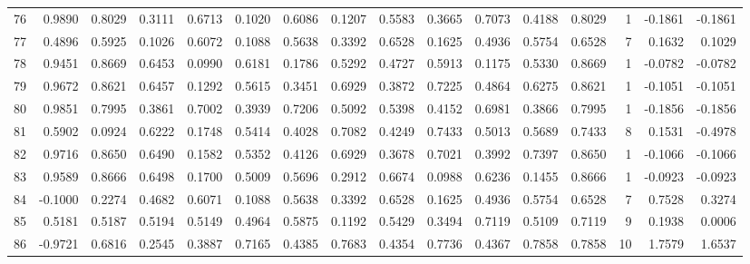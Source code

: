 \begin{tabular}{lrrrrrrrrrrrrrrr}
76  &      0.9890 &  0.8029 &  0.3111 &  0.6713 &  0.1020 &  0.6086 &  0.1207 &  0.5583 &  0.3665 &  0.7073 &   0.4188 &     0.8029 &      1 &                   -0.1861 &                    -0.1861 \\
77  &      0.4896 &  0.5925 &  0.1026 &  0.6072 &  0.1088 &  0.5638 &  0.3392 &  0.6528 &  0.1625 &  0.4936 &   0.5754 &     0.6528 &      7 &                    0.1632 &                     0.1029 \\
78  &      0.9451 &  0.8669 &  0.6453 &  0.0990 &  0.6181 &  0.1786 &  0.5292 &  0.4727 &  0.5913 &  0.1175 &   0.5330 &     0.8669 &      1 &                   -0.0782 &                    -0.0782 \\
79  &      0.9672 &  0.8621 &  0.6457 &  0.1292 &  0.5615 &  0.3451 &  0.6929 &  0.3872 &  0.7225 &  0.4864 &   0.6275 &     0.8621 &      1 &                   -0.1051 &                    -0.1051 \\
80  &      0.9851 &  0.7995 &  0.3861 &  0.7002 &  0.3939 &  0.7206 &  0.5092 &  0.5398 &  0.4152 &  0.6981 &   0.3866 &     0.7995 &      1 &                   -0.1856 &                    -0.1856 \\
81  &      0.5902 &  0.0924 &  0.6222 &  0.1748 &  0.5414 &  0.4028 &  0.7082 &  0.4249 &  0.7433 &  0.5013 &   0.5689 &     0.7433 &      8 &                    0.1531 &                    -0.4978 \\
82  &      0.9716 &  0.8650 &  0.6490 &  0.1582 &  0.5352 &  0.4126 &  0.6929 &  0.3678 &  0.7021 &  0.3992 &   0.7397 &     0.8650 &      1 &                   -0.1066 &                    -0.1066 \\
83  &      0.9589 &  0.8666 &  0.6498 &  0.1700 &  0.5009 &  0.5696 &  0.2912 &  0.6674 &  0.0988 &  0.6236 &   0.1455 &     0.8666 &      1 &                   -0.0923 &                    -0.0923 \\
84  &     -0.1000 &  0.2274 &  0.4682 &  0.6071 &  0.1088 &  0.5638 &  0.3392 &  0.6528 &  0.1625 &  0.4936 &   0.5754 &     0.6528 &      7 &                    0.7528 &                     0.3274 \\
85  &      0.5181 &  0.5187 &  0.5194 &  0.5149 &  0.4964 &  0.5875 &  0.1192 &  0.5429 &  0.3494 &  0.7119 &   0.5109 &     0.7119 &      9 &                    0.1938 &                     0.0006 \\
86  &     -0.9721 &  0.6816 &  0.2545 &  0.3887 &  0.7165 &  0.4385 &  0.7683 &  0.4354 &  0.7736 &  0.4367 &   0.7858 &     0.7858 &     10 &                    1.7579 &                     1.6537 \\

\end{tabular}
